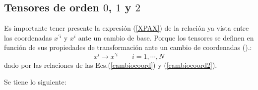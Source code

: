 \subsection{Tensores de orden $0$, $1$ y $2$}
\label{T012}
Es importante tener presente la expresión  (\ref{XPAX})  de la relación ya vista  entre las coordenadas $x^{\prime i}$ y $x^{i}$  ante un cambio de base. Porque los tensores se definen en función de sus propiedades de transformación ante un cambio de coordenadas  (\cite{spain}).:
\begin{equation}
\label{Cambiocoord}
x^{i} \rightarrow x^{\prime i}  \qquad i=1,\cdots,N
\end{equation}
dado por las relaciones de las Ecs.(\ref{cambiocoord}) y (\ref{cambiocoord2}).

\bigskip

Se tiene lo siguiente:

\bigskip

